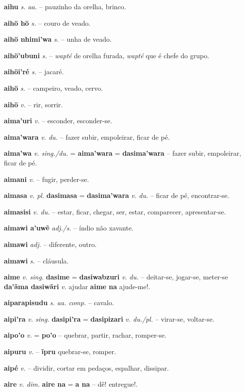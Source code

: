 \textbf{aihu} \textit{s. aa.} -- pauzinho da orelha, brinco.

\textbf{aihö hö} \textit{s.} -- couro de veado.

\textbf{aihö nhimi'wa} \textit{s.} -- unha de veado.

\textbf{aihö'ubuni} \textit{s.} -- \textit{wapté} de orelha furada, \textit{wapté} que é chefe do grupo.

\textbf{aihöi'ré} \textit{s.} -- jacaré.

\textbf{aihö} \textit{s.} -- campeiro, veado, cervo.

\textbf{aihö} \textit{v.} -- rir, sorrir.

\textbf{aima'uri} \textit{v.} -- esconder, esconder-se.

\textbf{aima'wara} \textit{v. du.} -- fazer subir, empoleirar, ficar de pé.

\textbf{aima'wa} \textit{v. sing./du.} = \textbf{aima'wara} = \textbf{dasima'wara} -- fazer subir, empoleirar, ficar de pé.

\textbf{aimani} \textit{v.} -- fugir, perder-se.

\textbf{aimasa} \textit{v. pl.} \textbf{dasimasa} = \textbf{dasima'wara} \textit{v. du.} -- ficar de pé, encontrar-se.

\textbf{aimasisi} \textit{v. du.} -- estar, ficar, chegar, ser, estar, comparecer, apresentar-se.

\textbf{aimawi a'uwẽ} \textit{adj./s.} -- índio não xavante.

\textbf{aimawi} \textit{adj.} -- diferente, outro.

\textbf{aimawi} \textit{s.} -- cláusula.

\textbf{aime} \textit{v. sing.} \textbf{dasime} = \textbf{dasiwabzuri} \textit{v. du.} -- deitar-se, jogar-se, meter-se  \textbf{da'ãma dasiwãri} \textit{v.} ajudar  \textbf{aime na} ajude-me!.

\textbf{aiparapisudu} \textit{s. aa. comp.} -- cavalo.

\textbf{aipi'ra} \textit{v. sing.} \textbf{dasipi'ra} = \textbf{dasipizari} \textit{v. du./pl.} -- virar-se, voltar-se.

\textbf{aipo'o} \textit{v.} = \textbf{po'o} -- quebrar, partir, rachar, romper-se.

\textbf{aipuru} \textit{v.} -- \textbf{ĩpru} quebrar-se, romper.

\textbf{aipé} \textit{v.} -- dividir, cortar em pedaços, espalhar, dissipar.

\textbf{aire} \textit{v. dim.} \textbf{aire na} = \textbf{a na} -- dê! entregue!.


